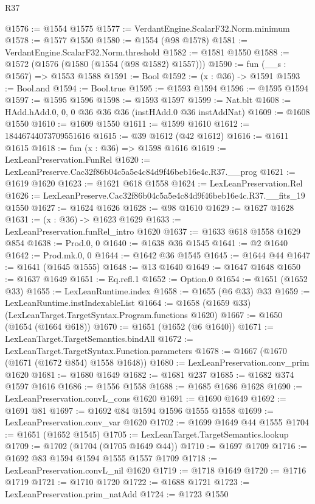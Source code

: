 \begin{lexlean}{R37}
\begin{coremodule}
@1576 := @1554 @1575
@1577 := VerdantEngine.ScalarF32.Norm.minimum
@1578 := @1577 @1550
@1580 := @1554 (@98 @1578)
@1581 := VerdantEngine.ScalarF32.Norm.threshold
@1582 := @1581 @1550
@1588 := @1572 (@1576 (@1580 (@1554 (@98 @1582) @1557)))
@1590 := fun (__s : @1567) => @1553 @1588
@1591 := Bool
@1592 := (x : @36) -> @1591
@1593 := Bool.and
@1594 := Bool.true
@1595 := @1593 @1594
@1596 := @1595 @1594
@1597 := @1595 @1596
@1598 := @1593 @1597
@1599 := Nat.blt
@1608 := HAdd.hAdd.{0, 0, 0} @36 @36 @36 (instHAdd.{0} @36 instAddNat)
@1609 := @1608 @1550
@1610 := @1609 @1550
@1611 := @1599 @1610
@1612 := 18446744073709551616
@1615 := @39 @1612 (@42 @1612)
@1616 := @1611 @1615
@1618 := fun (x : @36) => @1598 @1616
@1619 := LexLeanPreservation.FunRel
@1620 := LexLeanPreserve.Cac32f86b04c5a5e4c84d9f46beb16e4c.R37.__prog
@1621 := @1619 @1620
@1623 := @1621 @618 @1558
@1624 := LexLeanPreservation.Rel
@1626 := LexLeanPreserve.Cac32f86b04c5a5e4c84d9f46beb16e4c.R37.__fits_19 @1550
@1627 := @1624 @1626
@1628 := @98 @1610
@1629 := @1627 @1628
@1631 := (x : @36) -> @1623 @1629
@1633 := LexLeanPreservation.funRel_intro @1620
@1637 := @1633 @618 @1558 @1629 @854
@1638 := Prod.{0, 0}
@1640 := @1638 @36 @1545
@1641 := @2 @1640
@1642 := Prod.mk.{0, 0}
@1644 := @1642 @36 @1545
@1645 := @1644 @44
@1647 := @1641 (@1645 @1555)
@1648 := @13 @1640
@1649 := @1647 @1648
@1650 := @1637 @1649
@1651 := Eq.refl.{1}
@1652 := Option.{0}
@1654 := @1651 (@1652 @33)
@1655 := LexLeanRuntime.index
@1658 := @1655 (@6 @33) @33
@1659 := LexLeanRuntime.instIndexableList
@1664 := @1658 (@1659 @33) (LexLeanTarget.TargetSyntax.Program.functions @1620)
@1667 := @1650 (@1654 (@1664 @618))
@1670 := @1651 (@1652 (@6 @1640))
@1671 := LexLeanTarget.TargetSemantics.bindAll
@1672 := LexLeanTarget.TargetSyntax.Function.parameters
@1678 := @1667 (@1670 (@1671 (@1672 @854) @1558 @1648))
@1680 := LexLeanPreservation.conv_prim @1620
@1681 := @1680 @1649
@1682 := @1681 @237
@1685 := @1682 @374 @1597 @1616
@1686 := @1556 @1558
@1688 := @1685 @1686 @1628
@1690 := LexLeanPreservation.convL_cons @1620
@1691 := @1690 @1649
@1692 := @1691 @81
@1697 := @1692 @84 @1594 @1596 @1555 @1558
@1699 := LexLeanPreservation.conv_var @1620
@1702 := @1699 @1649 @44 @1555
@1704 := @1651 (@1652 @1545)
@1705 := LexLeanTarget.TargetSemantics.lookup
@1709 := @1702 (@1704 (@1705 @1649 @44))
@1710 := @1697 @1709
@1716 := @1692 @83 @1594 @1594 @1555 @1557 @1709
@1718 := LexLeanPreservation.convL_nil @1620
@1719 := @1718 @1649
@1720 := @1716 @1719
@1721 := @1710 @1720
@1722 := @1688 @1721
@1723 := LexLeanPreservation.prim_natAdd
@1724 := @1723 @1550

\end{coremodule}
\end{lexlean}
